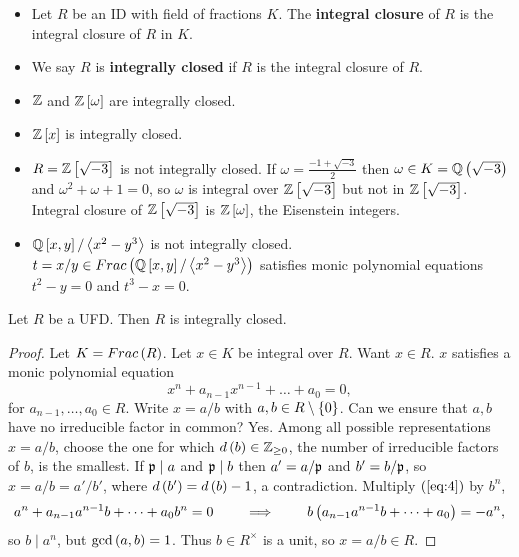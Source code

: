 \begin{definition}
\hfill
\begin{itemize}
\item Let $ R $ be an ID with field of fractions $ K $. The \textbf{integral closure} of $ R $ is the integral closure of $ R $ in $ K $.
\item We say $ R $ is \textbf{integrally closed} if $ R $ is the integral closure of $ R $.
\end{itemize}
\end{definition}

\begin{example*}
\hfill
\begin{itemize}
\item $ \mathbb{Z} $ and $ \mathbb{Z}\left[ \omega \right] $ are integrally closed.
\item $ \mathbb{Z}\left[ x \right] $ is integrally closed.
\item $ R = \mathbb{Z}\left[ \sqrt{-3} \right] $ is not integrally closed. If $ \omega = \tfrac{-1 + \sqrt{-3}}{2} $ then $ \omega \in K = \mathbb{Q}\left( \sqrt{-3} \right) $ and $ \omega^2 + \omega + 1 = 0 $, so $ \omega $ is integral over $ \mathbb{Z}\left[ \sqrt{-3} \right] $ but not in $ \mathbb{Z}\left[ \sqrt{-3} \right] $. Integral closure of $ \mathbb{Z}\left[ \sqrt{-3} \right] $ is $ \mathbb{Z}\left[ \omega \right] $, the Eisenstein integers.
\item $ \mathbb{Q}\left[ x, y \right] / \left\langle x^2 - y^3 \right\rangle $ is not integrally closed. $ t = x / y \in Frac\left( \mathbb{Q}\left[ x, y \right] / \left\langle x^2 - y^3 \right\rangle \right) $ satisfies monic polynomial equations $ t^2 - y = 0 $ and $ t^3 - x = 0 $.
\end{itemize}
\end{example*}


\begin{proposition}
Let $ R $ be a UFD. Then $ R $ is integrally closed.
\end{proposition}

\begin{proof}
Let $ K = Frac\left( R \right) $. Let $ x \in K $ be integral over $ R $. Want $ x \in R $. $ x $ satisfies a monic polynomial equation
\begin{equation}
\label{eq:4}
x^n + a_{n - 1}x^{n - 1} + \dots + a_0 = 0,
\end{equation}
for $ a_{n - 1}, \dots, a_0 \in R $. Write $ x = a / b $ with $ a, b \in R \setminus \left\{ 0 \right\} $. Can we ensure that $ a, b $ have no irreducible factor in common? Yes. Among all possible representations $ x = a / b $, choose the one for which $ d\left( b \right) \in \mathbb{Z}_{\ge 0} $, the number of irreducible factors of $ b $, is the smallest. If $ \mathfrak{p} \mid a $ and $ \mathfrak{p} \mid b $ then $ a' = a / \mathfrak{p} $ and $ b' = b / \mathfrak{p} $, so $ x = a / b = a' / b' $, where $ d\left( b' \right) = d\left( b \right) - 1 $, a contradiction. Multiply $ \left( \ref{eq:4} \right) $ by $ b^n $,
$$ a^n + a_{n - 1}a^{n - 1}b + \dots + a_0b^n = 0 \qquad \implies \qquad b\left( a_{n - 1}a^{n - 1}b + \dots + a_0 \right) = -a^n, $$
so $ b \mid a^n $, but $ \gcd\left( a, b \right) = 1 $. Thus $ b \in R^\times $ is a unit, so $ x = a / b \in R $.
\end{proof}

